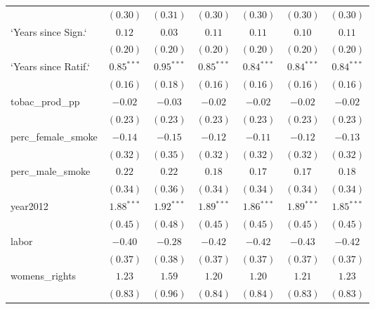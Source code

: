 \begin{table}[!h]
\begin{center}
\begin{tabular}{l c c c c c c }
                        & $(0.30)$     & $(0.31)$     & $(0.30)$     & $(0.30)$     & $(0.30)$     & $(0.30)$     \\
`Years since Sign.`     & $0.12$       & $0.03$       & $0.11$       & $0.11$       & $0.10$       & $0.11$       \\
                        & $(0.20)$     & $(0.20)$     & $(0.20)$     & $(0.20)$     & $(0.20)$     & $(0.20)$     \\
`Years since Ratif.`    & $0.85^{***}$ & $0.95^{***}$ & $0.85^{***}$ & $0.84^{***}$ & $0.84^{***}$ & $0.84^{***}$ \\
                        & $(0.16)$     & $(0.18)$     & $(0.16)$     & $(0.16)$     & $(0.16)$     & $(0.16)$     \\
tobac\_prod\_pp         & $-0.02$      & $-0.03$      & $-0.02$      & $-0.02$      & $-0.02$      & $-0.02$      \\
                        & $(0.23)$     & $(0.23)$     & $(0.23)$     & $(0.23)$     & $(0.23)$     & $(0.23)$     \\
perc\_female\_smoke     & $-0.14$      & $-0.15$      & $-0.12$      & $-0.11$      & $-0.12$      & $-0.13$      \\
                        & $(0.32)$     & $(0.35)$     & $(0.32)$     & $(0.32)$     & $(0.32)$     & $(0.32)$     \\
perc\_male\_smoke       & $0.22$       & $0.22$       & $0.18$       & $0.17$       & $0.17$       & $0.18$       \\
                        & $(0.34)$     & $(0.36)$     & $(0.34)$     & $(0.34)$     & $(0.34)$     & $(0.34)$     \\
year2012                & $1.88^{***}$ & $1.92^{***}$ & $1.89^{***}$ & $1.86^{***}$ & $1.89^{***}$ & $1.85^{***}$ \\
                        & $(0.45)$     & $(0.48)$     & $(0.45)$     & $(0.45)$     & $(0.45)$     & $(0.45)$     \\
labor                   & $-0.40$      & $-0.28$      & $-0.42$      & $-0.42$      & $-0.43$      & $-0.42$      \\
                        & $(0.37)$     & $(0.38)$     & $(0.37)$     & $(0.37)$     & $(0.37)$     & $(0.37)$     \\
womens\_rights          & $1.23$       & $1.59$       & $1.20$       & $1.20$       & $1.21$       & $1.23$       \\
                        & $(0.83)$     & $(0.96)$     & $(0.84)$     & $(0.84)$     & $(0.83)$     & $(0.83)$     \\

\end{tabular}
\end{center}
\end{table}
